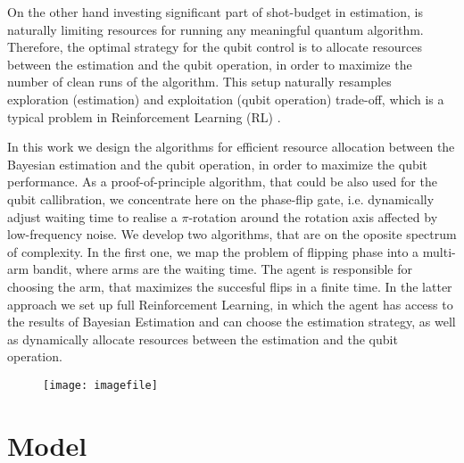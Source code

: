 \documentclass[aps,twocolumn,pra,notitlepage,]{revtex4-2}
\begin{document}
On the other hand investing significant part of shot-budget in estimation, is naturally limiting resources for running any meaningful quantum algorithm. Therefore, the optimal strategy for the qubit control is to allocate resources between the estimation and the qubit operation, in order to maximize the number of clean runs of the algorithm. This setup naturally resamples exploration (estimation) and exploitation (qubit operation) trade-off, which is a typical problem in Reinforcement Learning (RL) \cite{}. 

In this work we design the algorithms for efficient resource allocation between the Bayesian estimation and the qubit operation, in order to maximize the qubit performance. As a proof-of-principle algorithm, that could be also used for the qubit callibration, we concentrate here on the phase-flip gate, i.e. dynamically adjust waiting time to realise a $\pi$-rotation around the rotation axis affected by low-frequency noise. We develop two algorithms, that are on the oposite spectrum of complexity. In the first one, we map the problem of flipping phase into a multi-arm bandit, where arms are the waiting time. The agent is responsible for choosing the arm, that maximizes the succesful flips in a finite time. In the latter approach we set up full Reinforcement Learning, in which the agent has access to the results of Bayesian Estimation and can choose the estimation strategy, as well as dynamically allocate resources between the estimation and the qubit operation.

\begin{figure}
\texttt{[image: imagefile]}
\end{figure}


\section{Model}
\end{document}

